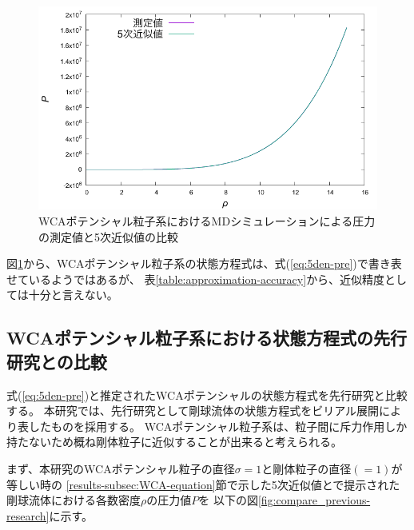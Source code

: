 \documentclass[titlepage]{jsreport}
\begin{document}
{{{\begin{figure}[htbp]
    \begin{center}
        \includegraphics[width=14cm]{fig/5den-pre.pdf}
    \end{center}
    \caption{WCAポテンシャル粒子系におけるMDシミュレーションによる圧力の測定値と5次近似値の比較}
    \label{fig:5den-pre}
\end{figure}

\newpage
図\ref{fig:5den-pre}から、WCAポテンシャル粒子系の状態方程式は、式(\ref{eq:5den-pre})で書き表せているようではあるが、
表\ref{table:approximation-accuracy}から、近似精度としては十分と言えない。

\subsection{WCAポテンシャル粒子系における状態方程式の先行研究との比較}\label{results-subsec:previous-research}
式(\ref{eq:5den-pre})と推定されたWCAポテンシャルの状態方程式を先行研究と比較する。
本研究では、先行研究として剛球流体の状態方程式をビリアル展開により表したものを採用する\cite{hard-sphere}。
WCAポテンシャル粒子系は、粒子間に斥力作用しか持たないため概ね剛体粒子に近似することが出来ると考えられる。

まず、本研究のWCAポテンシャル粒子の直径$\sigma=1$と剛体粒子の直径$(=1)$が等しい時の
\ref{results-subsec:WCA-equation}節で示した5次近似値と\cite{hard-sphere}で提示された剛球流体における各数密度$\rho$の圧力値$P$を
以下の図\ref{fig:compare_previous-research}に示す。

}}}
\end{document}
